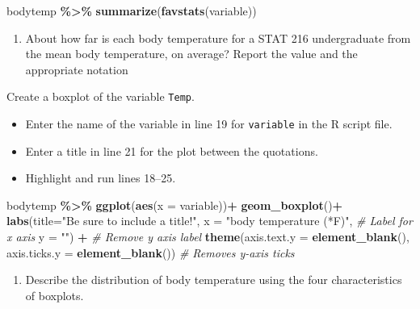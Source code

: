 \documentclass[
]{report}
\newenvironment{Shaded}{\begin{snugshade}}{\end{snugshade}}
\newcommand{\AttributeTok}[1]{\textcolor[rgb]{0.13,0.29,0.53}{#1}}
\newcommand{\CommentTok}[1]{\textcolor[rgb]{0.56,0.35,0.01}{\textit{#1}}}
\newcommand{\FunctionTok}[1]{\textcolor[rgb]{0.13,0.29,0.53}{\textbf{#1}}}
\newcommand{\NormalTok}[1]{#1}
\newcommand{\SpecialCharTok}[1]{\textcolor[rgb]{0.81,0.36,0.00}{\textbf{#1}}}
\newcommand{\StringTok}[1]{\textcolor[rgb]{0.31,0.60,0.02}{#1}}
\providecommand{\tightlist}{%
  \setlength{\itemsep}{0pt}\setlength{\parskip}{0pt}}
\begin{document}
\begin{Shaded}
\begin{Highlighting}[]
\NormalTok{bodytemp }\SpecialCharTok{\%\textgreater{}\%}
    \FunctionTok{summarize}\NormalTok{(}\FunctionTok{favstats}\NormalTok{(variable))}
\end{Highlighting}
\end{Shaded}

\begin{enumerate}
\def\labelenumi{\arabic{enumi}.}
\tightlist
\item
  About how far is each body temperature for a STAT 216 undergraduate from the mean body temperature, on average? Report the value and the appropriate notation
\end{enumerate}

\vspace{0.3in}

Create a boxplot of the variable \texttt{Temp}.

\begin{itemize}
\item
  Enter the name of the variable in line 19 for \texttt{variable} in the R script file.
\item
  Enter a title in line 21 for the plot between the quotations.
\item
  Highlight and run lines 18--25.
\end{itemize}

\begin{Shaded}
\begin{Highlighting}[]
\NormalTok{bodytemp }\SpecialCharTok{\%\textgreater{}\%}
  \FunctionTok{ggplot}\NormalTok{(}\FunctionTok{aes}\NormalTok{(}\AttributeTok{x =}\NormalTok{ variable))}\SpecialCharTok{+}
  \FunctionTok{geom\_boxplot}\NormalTok{()}\SpecialCharTok{+}
  \FunctionTok{labs}\NormalTok{(}\AttributeTok{title=}\StringTok{"Be sure to include a title!"}\NormalTok{,}
       \AttributeTok{x =} \StringTok{"body temperature (*F)"}\NormalTok{, }\CommentTok{\# Label for x axis}
       \AttributeTok{y =} \StringTok{""}\NormalTok{) }\SpecialCharTok{+} \CommentTok{\# Remove y axis label}
        \FunctionTok{theme}\NormalTok{(}\AttributeTok{axis.text.y =} \FunctionTok{element\_blank}\NormalTok{(), }
          \AttributeTok{axis.ticks.y =} \FunctionTok{element\_blank}\NormalTok{()) }\CommentTok{\# Removes y{-}axis ticks}
\end{Highlighting}
\end{Shaded}

\begin{enumerate}
\def\labelenumi{\arabic{enumi}.}
\setcounter{enumi}{1}
\tightlist
\item
  Describe the distribution of body temperature using the four characteristics of boxplots.
\end{enumerate}
\end{document}

